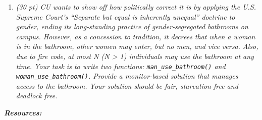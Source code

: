 \documentclass[12pt]{article}
\begin{document}
\begin{enumerate}
\item{\textit{(30 pt) CU wants to show off how politically correct it is by applying the U.S. Supreme
Court’s “Separate but equal is inherently unequal” doctrine to gender, ending its
long-standing practice of gender-segregated bathrooms on campus. However, as a
concession to tradition, it decrees that when a woman is in the bathroom, other women
may enter, but no men, and vice versa. Also, due to fire code, at most N (N > 1)
individuals may use the bathroom at any time. Your task is to write two functions:
\texttt{man\_use\_bathroom()} and \texttt{woman\_use\_bathroom()}. Provide a monitor-based solution
that manages access to the bathroom. Your solution should be fair, starvation free and
deadlock free.}}
\end{enumerate}
\newpage

\textbf{\textit{Resources:}}
\end{document}
